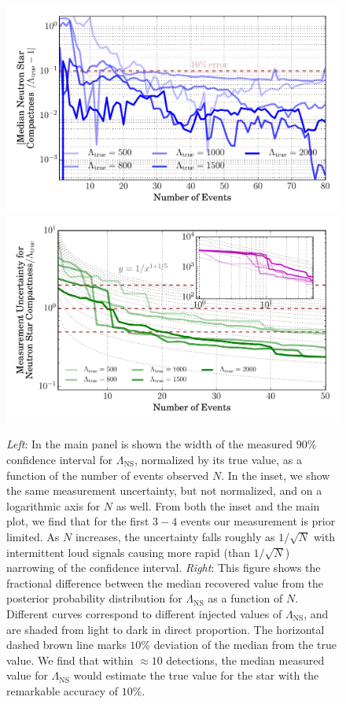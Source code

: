 \documentclass[aps,prd,amsmath,floats,floatfix, twocolumn,
superscriptaddress,nofootinbib,showpacs]{revtex4-1}
\newcommand{\lambdans}{\Lambda_\mathrm{NS}}
\begin{document}
%
% 
%
% 
\begin{figure}
\centering    
\includegraphics[width=1.025\columnwidth]{plots/RelErrorLambdaMedian_vs_N.pdf}
\includegraphics[width=1.025\columnwidth]{plots/LambdaCIWidths_vs_N.pdf}
\caption{{\it Left}: In the main panel is shown the width of the measured $90\%$ 
confidence interval for $\lambdans$, normalized by its true value,
 as a function of the number of events observed $N$. In the inset, we
 show the same measurement uncertainty, but not normalized, and on a 
 logarithmic axis for $N$ as well.
% 
 From both the inset and the main plot, we find that for the first $3-4$ events
 our measurement is prior limited. As $N$ increases, the uncertainty falls 
 roughly as $1/\sqrt{N}$ with intermittent loud signals causing more rapid 
 (than $1/\sqrt{N}$) narrowing of the confidence interval.
%  
 {\it Right}: This figure shows the fractional difference between the median
 recovered value from the posterior probability distribution for $\lambdans$
 as a function of $N$. Different curves correspond to different injected values
 of $\lambdans$, and are shaded from light to dark in direct proportion. 
 The horizontal dashed brown line marks $10\%$ deviation of the median from the 
 true value.
%  
We find that within $\approx 10$ detections, the median measured value for
$\lambdans$ would estimate the true value for the star with the remarkable 
accuracy of $10\%$.
}
\label{fig:TT_LambdaError_vs_N_L500_2000_CI90_0}
\end{figure}
\end{document}
